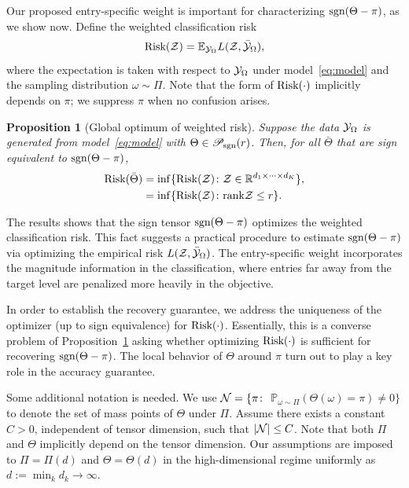 \documentclass{article}
\theoremstyle{plain}
\newtheorem{prop}{Proposition}
\theoremstyle{definition}
\def\sign{\textup{sgn}}
\def\caliP{\mathscr{P}_{\textup{sgn}}}
\def\risk{\textup{Risk}}
\begin{document}
Our proposed entry-specific weight is important for characterizing $\sign(\Theta-\pi)$, as we show now. Define the weighted classification risk 
\begin{equation}\label{eq:population}
\textup{Risk}(\mathcal{Z})=\mathbb{E}_{\mathcal{Y}_\Omega}L(\mathcal{Z},\bar{\mathcal{Y}}_\Omega),
\end{equation}
where the expectation is taken with respect to $\mathcal{Y}_\Omega$ under model~\eqref{eq:model} and the sampling distribution $\omega\sim\Pi$. Note that the form of $\textup{Risk}(\cdot)$ implicitly depends on $\pi$; we suppress $\pi$ when no confusion arises. 
\begin{prop}[Global optimum of weighted risk]\label{prop:global}
Suppose the data $\mathcal{Y}_\Omega$ is generated from model~\eqref{eq:model} with $\Theta \in \caliP(r)$. Then, for all $\bar \Theta$ that are sign equivalent to $\sign(\Theta-\pi)$, 
\begin{align}\label{eq:optimal}
\textup{Risk}(\bar \Theta )&=\inf\{\textup{Risk}(\mathcal{Z})\colon \mathcal{Z}\in\mathbb{R}^{d_1\times \cdots \times d_K}\},\notag \\
&=\inf\{\textup{Risk}(\mathcal{Z})\colon \textup{rank} \mathcal{Z}\leq r\}.
\end{align}
\end{prop}
The results shows that the sign tensor $\sign(\Theta-\pi)$ optimizes the weighted classification risk. This fact suggests a practical procedure to estimate $\sign(\Theta-\pi)$ via optimizing the empirical risk $L(\mathcal{Z},\bar {\mathcal{Y}}_\Omega)$. The entry-specific weight incorporates the magnitude information in the classification, where entries far away from the target level are penalized more heavily in the objective. 

In order to establish the recovery guarantee, we address the uniqueness of the optimizer (up to sign equivalence) for $\risk(\cdot)$. Essentially, this is a converse problem of Proposition~\ref{prop:global} asking whether optimizing $\risk(\cdot)$ is sufficient for recovering $\sign(\Theta-\pi)$. The local behavior of $\Theta$ around $\pi$ turn out to play a key role in the accuracy guarantee. 

Some additional notation is needed. %
We use $\mathcal{N}=\{\pi\colon$  $\mathbb{P}_{\omega\sim \Pi}(\Theta(\omega)=\pi)\neq 0\}$ to denote the set of mass points of $\Theta$ under $\Pi$. Assume there exists a constant $C>0$, independent of tensor dimension, such that $|\mathcal{N}|\leq C$. Note that both $\Pi$ and $\Theta$ implicitly depend on the tensor dimension. Our assumptions are imposed to $\Pi=\Pi(d)$ and $\Theta=\Theta(d)$ in the high-dimensional regime uniformly as $d:=\min_kd_k\to\infty$. 
\end{document}
